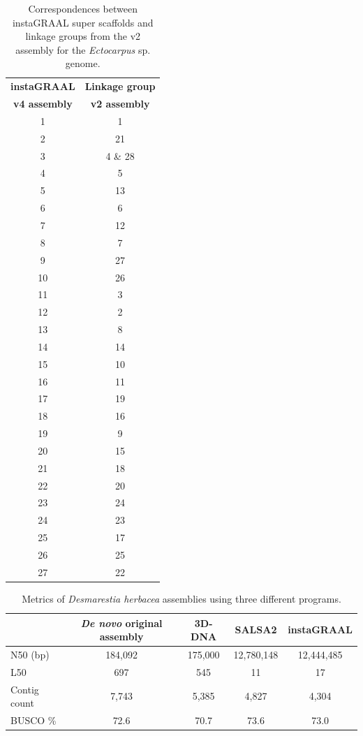 \begin{suppsection}
\begin{table}[ht]
\centering
\caption{Correspondences between instaGRAAL super scaffolds and linkage groups from the v2 assembly for the \textit{Ectocarpus} sp. genome.}
\begin{tabular}{|c|c|}
\hline
\textbf{instaGRAAL} & \textbf{Linkage group} \\
\textbf{v4 assembly} & \textbf{v2 assembly} \\
\hline
1 & 1 \\
2 & 21 \\
3 & 4 \& 28 \\
4 & 5 \\
5 & 13 \\
6 & 6 \\
7 & 12 \\
8 & 7 \\
9 & 27 \\
10 & 26 \\
11 & 3 \\
12 & 2 \\
13 & 8 \\
14 & 14 \\
15 & 10 \\
16 & 11 \\
17 & 19 \\
18 & 16 \\
19 & 9 \\
20 & 15 \\
21 & 18 \\
22 & 20 \\
23 & 24 \\
24 & 23 \\
25 & 17 \\
26 & 25 \\
27 & 22 \\
\hline
\end{tabular}
\label{tab:t3}
\end{table}

\begin{table}[ht]
\centering
\caption{Metrics of \textit{Desmarestia herbacea} assemblies using three different programs.}
\begin{tabular}{|l|c|c|c|c|}
\hline
    & \textbf{\textit{De novo} original assembly} & \textbf{3D-DNA} & \textbf{SALSA2} & \textbf{instaGRAAL} \\
\hline
N50 (bp) & 184,092 & 175,000 & 12,780,148 & 12,444,485 \\
L50 & 697 & 545 & 11 & 17 \\
Contig count & 7,743 & 5,385 & 4,827 & 4,304 \\
BUSCO \% & 72.6 & 70.7 & 73.6 & 73.0 \\
\hline
\end{tabular}
\label{tab:t4}
\end{table}


\end{suppsection}
